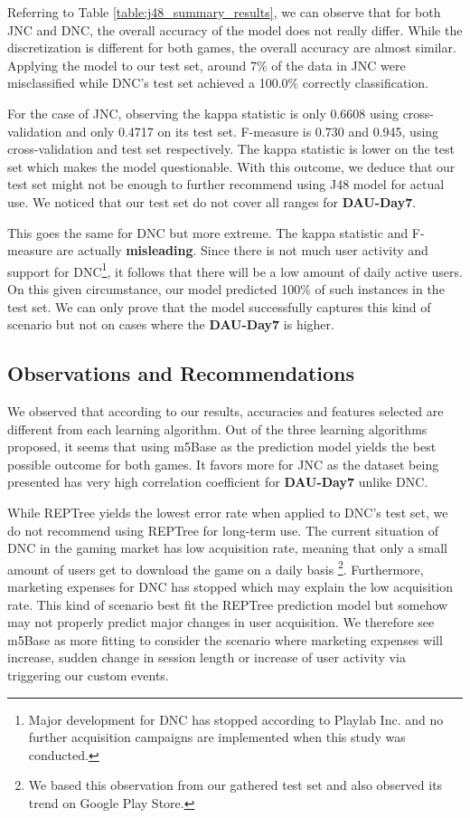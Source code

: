 Referring to Table \ref{table:j48_summary_results}, we can observe that for both JNC and DNC, the overall accuracy of the model does not really differ. While the discretization is different for both games, the overall accuracy are almost similar. Applying the model to our test set, around 7\% of the data in JNC were misclassified while DNC's test set achieved a 100.0\% correctly classification.

For the case of JNC, observing the kappa statistic is only 0.6608 using cross-validation and only 0.4717 on its test set. F-measure is 0.730 and 0.945, using cross-validation and test set respectively. The kappa statistic is lower on the test set which makes the model questionable. With this outcome, we deduce that our test set might not be enough to further recommend using J48 model for actual use. We noticed that our test set do not cover all ranges for \textbf{DAU-Day7}.

This goes the same for DNC but more extreme. The kappa statistic and F-measure are actually \textbf{misleading}. Since there is not much user activity and support for DNC\footnote{Major development for DNC has stopped according to Playlab Inc. and no further acquisition campaigns are implemented when this study was conducted.}, it follows that there will be a low amount of daily active users. On this given circumstance, our model predicted 100\% of such instances in the test set. We can only prove that the model successfully captures this kind of scenario but not on cases where the \textbf{DAU-Day7} is higher.

\subsection{Observations and Recommendations}
We observed that according to our results, accuracies and features selected are different from each learning algorithm. Out of the three learning algorithms proposed, it seems that using m5Base as the prediction model yields the best possible outcome for both games. It favors more for JNC as the dataset being presented has very high correlation coefficient for \textbf{DAU-Day7} unlike DNC.

While REPTree yields the lowest error rate when applied to DNC's test set, we do not recommend using REPTree for long-term use. The current situation of DNC in the gaming market has low acquisition rate, meaning that only a small amount of users get to download the game on a daily basis \footnote{We based this observation from our gathered test set and also observed its trend on Google Play Store.}. Furthermore, marketing expenses for DNC has stopped which may explain the low acquisition rate. This kind of scenario best fit the REPTree prediction model but somehow may not properly predict major changes in user acquisition. We therefore see m5Base as more fitting to consider the scenario where marketing expenses will increase, sudden change in session length or increase of user activity via triggering our custom events.

